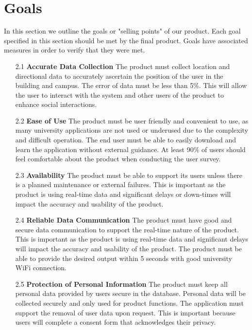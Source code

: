 \documentclass{article}
\begin{document}
\section{Goals}

In this section we outline the goals or "selling points" of our product. Each goal specified in this section should be met by the final product. Goals have associated measures in order to verify that they were met.

\begin{itemize}
    \item[2.1] \textbf{Accurate Data Collection} The product must collect location and directional data to accurately ascertain the position of the user in the building and campus. The error of data must be less than 5\%. This will allow the user to interact with the system and other users of the product to enhance social interactions. 

    \item[2.2] \textbf{Ease of Use} The product must be user friendly and convenient to use, as many university applications are not used or underused due to the complexity and difficult operation. The end user must be able to easily download and learn the application without external guidance. At least 90\% of users should feel comfortable about the product when conducting the user survey.

    \item[2.3] \textbf{Availability} The product must be able to support its users unless there is a planned maintenance or external failures. This is important as the product is using real-time data and significant delays or down-times will impact the accuracy and usability of the product.

    \item[2.4] \textbf{Reliable Data Communication} The product must have good and secure data communication to support the real-time nature of the product. This is important as the product is using real-time data and significant delays will impact the accuracy and usability of the product. The product must be able to provide the desired output within 5 seconds with good university WiFi connection.

    \item[2.5] \textbf{Protection of Personal Information} The product must keep all personal data provided by users secure in the database. Personal data will be collected securely and only used for product functions. The application must support the removal of user data upon request. This is important because users will complete a consent form that acknowledges their privacy.


\end{itemize}
\end{document}
